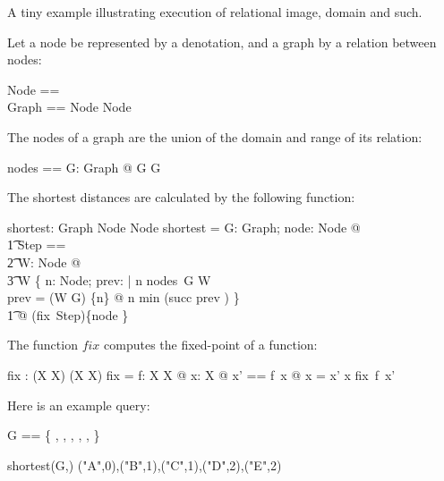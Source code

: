 \documentclass{article}
\begin{document}
A tiny example illustrating execution of relational image,
domain and such.

\bigskip

Let a node be represented by a denotation, and a graph by
a relation between nodes:

\begin{zed}
  Node == \denotation \\ 
  Graph == Node \rel Node 
\end{zed}

The nodes of a graph are the union of the domain and range of
its relation:

\begin{axdef}
  nodes == \lambda G: Graph @ \dom G \cup \ran G
\end{axdef}

The shortest distances are calculated by the following function:

\begin{axdef}
  shortest: Graph \cross Node \fun Node \ffun \nat
\where
  shortest = \lambda G: Graph; node: Node @ \\\t1
   \LET Step == \\\t2 \lambda W: Node \ffun \nat @ \\\t3 W \cup 
    \{ \< n: Node; prev: \power \nat | n \in nodes~G \setminus \dom W\\
            prev = (W \circ G\inv) \limg \{n\} \rimg \neq \emptyset
            @ n \mapsto min (succ \limg prev \rimg) \} \>
   \\\t1
   @
   (fix~Step)\{node \}
\end{axdef}

The function $fix$ computes the fixed-point of a function:

\begin{axdef}[X]
  fix : (X \pfun X) \fun (X \pfun X)
\where
  fix = \lambda f: X \pfun X @ 
           \lambda x: X @
              \LET x' == f~x @
              \IF x = x' \THEN x \ELSE fix~f~x'
\end{axdef}


Here is an example query:

\begin{zed}
  G == \{  \mapsto {},  \mapsto {},
           \mapsto {},  \mapsto {},
           \mapsto {},  \mapsto {} \}
\end{zed}

\begin{zexecexpr}
  shortest(G,)
\yields
{("A",0),("B",1),("C",1),("D",2),("E",2)} 
\end{zexecexpr}
\end{document}
